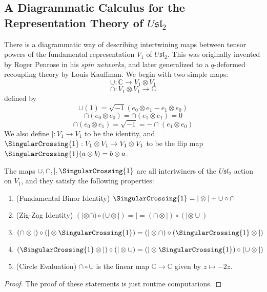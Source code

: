 \subsection{A Diagrammatic Calculus for the Representation Theory of $U\mathfrak{sl}_2$}
\label{subsec A Diagrammatic Calculus for sl2 Representations}


There is a diagrammatic way of describing intertwining maps between tensor powers of the fundamental representation $V_1$ of $U\mathfrak{sl}_2$. This was originally invented by Roger Penrose in his \emph{spin networks}, and later generalized to a $q$-deformed recoupling theory by Louis Kauffman. We begin with two simple maps:
\[
	\cup : \mathbb C \rightarrow V_1 \otimes V_1
\]
\[
	\cap : V_1 \otimes V_1 \rightarrow \mathbb C 
\]
defined by 
\[
	\cup(1) = \sqrt{-1} (e_0 \otimes e_1 - e_1 \otimes e_0)
\]
\[
	\cap(e_0 \otimes e_0) = \cap(e_1 \otimes e_1) = 0
\]
\[
	\cap(e_0 \otimes e_1) = \sqrt{-1} = -\cap(e_1 \otimes e_0)
\]
We also define $| : V_1 \rightarrow V_1$ to be the identity, and $\SingularCrossing{1} : V_1 \otimes V_1 \rightarrow V_1 \otimes V_1$ to be the flip map $\SingularCrossing{1}(a \otimes b) = b \otimes a$. 

\begin{lem}
\label{lem sl2 intertwiner properties}
The maps $\cup,\cap,|,\SingularCrossing{1}$ are all intertwiners of the $U\mathfrak{sl}_2$ action on $V_1$, and they satisfy the following properties:
\begin{enumerate}
	\item(Fundamental Binor Identity) $\SingularCrossing{1} = | \otimes | + \cup \circ \cap$
	\item(Zig-Zag Identity) $(| \otimes \cap) \circ (\cup \otimes |) = | = (\cap \otimes |) \circ (| \otimes \cup)$
	\item $(\cap \otimes |) \circ (| \otimes \SingularCrossing{1}) = (| \otimes \cap) \circ (\SingularCrossing{1} \otimes |)$
	\item $(\SingularCrossing{1} \otimes |) \circ (| \otimes \cup) = (| \otimes \SingularCrossing{1}) \circ (\cup \otimes |)$
	\item(Circle Evaluation) $\cap \circ \cup$ is the linear map $\mathbb C \rightarrow \mathbb C$ given by $z \mapsto -2z$.
\end{enumerate}
\end{lem}
\begin{proof}
The proof of these statements is just routine computations.
\end{proof}

